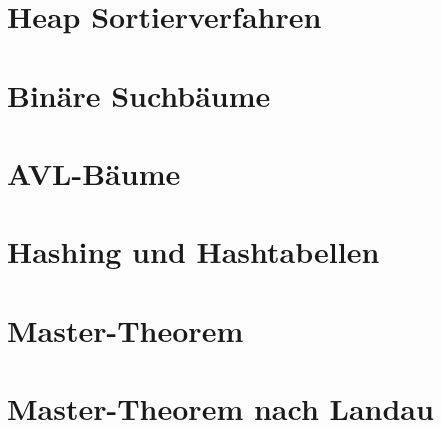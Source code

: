 \documentclass[12pt,a4paper]{article}
\begin{document}
\section{Heap Sortierverfahren}

\section{Binäre Suchbäume}

\section{AVL-Bäume}

\section{Hashing und Hashtabellen}

\section{Master-Theorem}

\section{Master-Theorem nach Landau}
\label{sec:MasterLandau}
\end{document}
